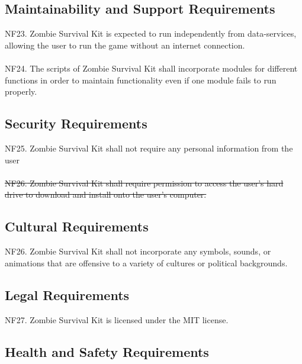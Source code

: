 \documentclass[12pt, titlepage]{article}
\begin{document}
\subsection{Maintainability and Support Requirements}

{\color{magenta} NF23.} Zombie Survival Kit is expected to run independently from data-services, allowing the user to run the game without an internet connection.
\\\\
{\color{magenta} NF24.} The scripts of Zombie Survival Kit shall incorporate modules for different functions in order to maintain functionality even if one module fails to run properly.

\subsection{Security Requirements}
{\color{magenta} NF25.} Zombie Survival Kit shall not require any personal information from the user
\\\\
\sout{{\color{magenta} NF26.} Zombie Survival Kit shall require permission to access the user’s hard drive to download and install onto the user’s computer.}

\subsection{Cultural Requirements}
{\color{magenta} NF26.} Zombie Survival Kit shall not incorporate any symbols, sounds, or animations that are offensive to a variety of cultures or political backgrounds.
\subsection{Legal Requirements}
{\color{magenta} NF27.} Zombie Survival Kit is licensed under the MIT license.
\subsection{Health and Safety Requirements}
\end{document}
